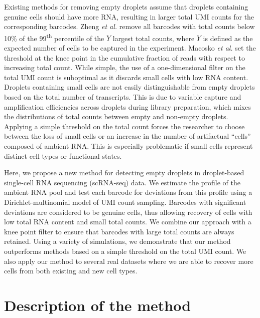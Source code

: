 \documentclass{bmcart}
\begin{document}
Existing methods for removing empty droplets assume that droplets containing genuine cells should have more RNA, resulting in larger total UMI counts for the corresponding barcodes.
Zheng \textit{et al.} \cite{zheng2017massively} remove all barcodes with total counts below 10\% of the 99\textsuperscript{th} percentile of the $Y$ largest total counts, where $Y$ is defined as the expected number of cells to be captured in the experiment.
Macosko \textit{et al.} \cite{macosko2015highly} set the threshold at the knee point in the cumulative fraction of reads with respect to increasing total count.
While simple, the use of a one-dimensional filter on the total UMI count is suboptimal as it discards small cells with low RNA content.
Droplets containing small cells are not easily distinguishable from empty droplets based on the total number of transcripts.
This is due to variable capture and amplification efficiencies across droplets during library preparation, which mixes the distributions of total counts between empty and non-empty droplets.
Applying a simple threshold on the total count forces the researcher to choose between the loss of small cells or an increase in the number of artifactual ``cells'' composed of ambient RNA.
This is especially problematic if small cells represent distinct cell types or functional states.

Here, we propose a new method for detecting empty droplets in droplet-based single-cell RNA sequencing (scRNA-seq) data.
We estimate the profile of the ambient RNA pool and test each barcode for deviations from this profile using a Dirichlet-multinomial model of UMI count sampling.
Barcodes with significant deviations are considered to be genuine cells, thus allowing recovery of cells with low total RNA content and small total counts.
We combine our approach with a knee point filter to ensure that barcodes with large total counts are always retained.
Using a variety of simulations, we demonstrate that our method outperforms methods based on a simple threshold on the total UMI count.
We also apply our method to several real datasets where we are able to recover more cells from both existing and new cell types.

\section*{Description of the method}
\end{document}
